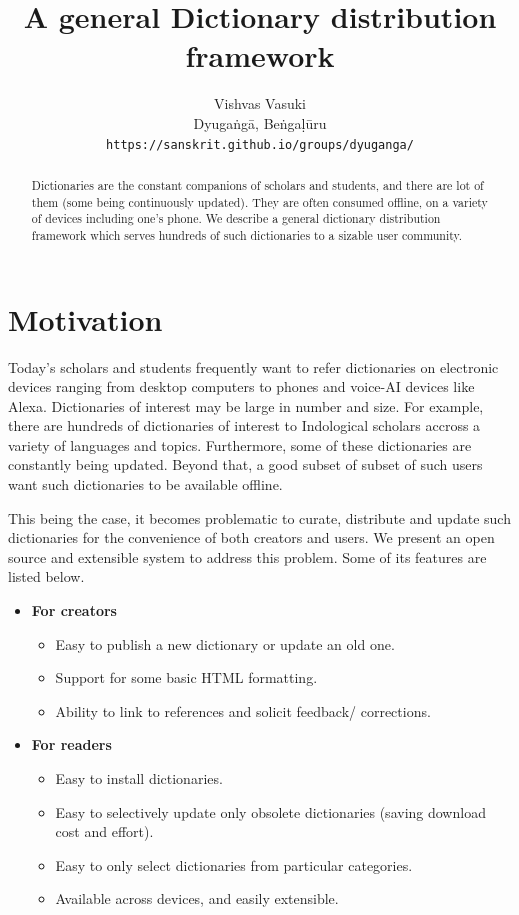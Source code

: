 \documentclass[11pt]{article}
\title{A general Dictionary distribution framework}
\author{
  Vishvas Vasuki \\
  Dyugaṅgā, Beṅgaḷūru \\
  {\tt https://sanskrit.github.io/groups/dyuganga/}
\\}
\date{}
\begin{document}
\maketitle
\begin{abstract}
Dictionaries are the constant companions of scholars and students, and there are lot of them (some being continuously updated). They are often consumed offline, on a variety of devices including one's phone. We describe a general dictionary distribution framework which serves hundreds of such dictionaries to a sizable user community.
\end{abstract}

\section{Motivation}
Today's scholars and students frequently want to refer dictionaries on electronic devices ranging from desktop computers to phones and voice-AI devices like Alexa. Dictionaries of interest may be large in number and size. For example, there are hundreds of dictionaries of interest to Indological scholars accross a variety of languages and topics. Furthermore, some of these dictionaries are constantly being updated. Beyond that, a good subset of subset of such users want such dictionaries to be available offline.

This being the case, it becomes problematic to curate, distribute and update such dictionaries for the convenience of both creators and users. We present an open source and extensible system to address this problem. Some of its features are listed below.

\begin{itemize}
\tightlist
\item \textbf{For creators}
\begin{itemize}
\tightlist
\item Easy to publish a new dictionary or update an old one.
\item Support for some basic HTML formatting.
\item Ability to link to references and solicit feedback/ corrections.
\end{itemize}

\item \textbf{For readers}
\begin{itemize}
\tightlist
\item Easy to install dictionaries.
\item Easy to selectively update only obsolete dictionaries (saving download cost and effort).
\item Easy to only select dictionaries from particular categories.
\item Available across devices, and easily extensible.
\end{itemize}
\end{itemize}
\end{document}

